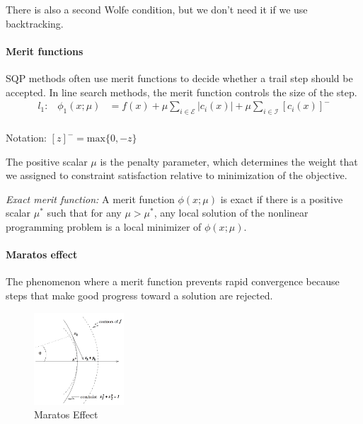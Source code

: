 There is also a second Wolfe condition, but we don't need it if we use backtracking.

\paragraph{Merit functions} SQP methods often use merit functions to decide whether a trail step should be accepted. In line search methods, the merit function controls the size of the step.
\begin{equation}
    \begin{split}
        l_1\text{:} \quad \phi_1(x;\mu) &= f(x) + \mu \sum_{i \in \mathcal{E}} |c_i(x)| + \mu \sum_{i \in \mathcal{I}} [c_i(x)]^-\\
    \end{split}
\end{equation}

Notation: $[z]^- = \text{max}\{0, -z\}$

The positive scalar $\mu$ is the penalty parameter, which determines the weight that we assigned to constraint satisfaction relative to minimization of the objective.

\textit{Exact merit function:} A merit function $\phi(x; \mu)$ is exact if there is a positive scalar $\mu^*$ such that for any $\mu > \mu^*$, any local solution of the nonlinear programming problem is a local minimizer of $\phi(x; \mu)$. 

\paragraph{Maratos effect} The phenomenon where a merit function prevents rapid convergence because steps that make good progress toward a solution are rejected.

\begin{figure}[H]
	\centering
	\includegraphics[width=0.3\textwidth]{images/maratos_effect}
	\caption{Maratos Effect}
	\label{fig:maratos_effect}
\end{figure}

